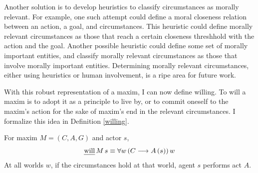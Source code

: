 \begin{isabellebody}
\begin{isamarkuptext}
Another solution is to develop heuristics to classify circumstances as morally 
relevant. For example, one such attempt could define a moral closeness relation between an action, a 
goal, and circumstances. This heuristic could define morally relevant circumstances as those that 
reach a certain closeness threshhold with the action and the goal. Another possible heuristic could 
define some set of morally important entities, and classify morally relevant circumstances as those
that involve morally important entities. Determining morally relevant
circumstances, either using heuristics or human involvement, is a ripe area for future work.

With this robust representation of a maxim, I can now define willing. To will a maxim is to adopt it 
as a principle to live by, or to commit oneself to the maxim's action for the 
sake of maxim's end in the relevant circumstances. I formalize this idea in Definition \ref{willing}.

\begin{definition}[Willing]\label{willing}
For maxim $M = (C, A, G)$ and actor $s$,
$$\text{\emph{will}} \, M \, s \equiv \forall w \, (C \longrightarrow A \, (s)) \, w$$
\noindent At all worlds $w$, if the circumstances hold at that world, agent $s$ performs act $A$.

\end{definition}


\end{isamarkuptext}
\end{isabellebody}
